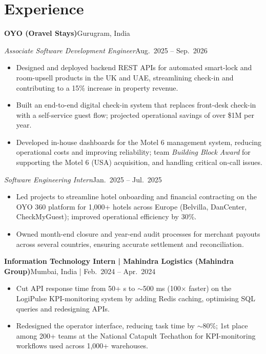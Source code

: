 \documentclass[10pt,a4paper]{article}
\newcommand{\entry}[2]{\textbf{#1}\hfill #2\par}
\newcommand{\subentry}[2]{\textit{#1}\hfill #2\par}
\begin{document}
\section{Experience}
\entry{OYO (Oravel Stays)}{Gurugram, India}
\subentry{Associate Software Development Engineer}{Aug.\ 2025 -- Sep.\ 2026}
\begin{itemize}
  \item Designed and deployed backend REST APIs for automated smart-lock and room-upsell products in the UK and UAE, streamlining check-in and contributing to a 15\% increase in property revenue.
  \item Built an end-to-end digital check-in system that replaces front-desk check-in with a self-service guest flow; projected operational savings of over \$1M per year.
  \item Developed in-house dashboards for the Motel 6 management system, reducing operational costs and improving reliability; team \textit{Building Block Award} for supporting the Motel 6 (USA) acquisition, and handling critical on-call issues.
\end{itemize}
\subentry{Software Engineering Intern}{Jan.\ 2025 -- Jul.\ 2025}
\begin{itemize}
  \item Led projects to streamline hotel onboarding and financial contracting on the OYO 360 platform for 1,000+ hotels across Europe (Belvilla, DanCenter, CheckMyGuest); improved operational efficiency by 30\%.
  \item Owned month-end closure and year-end audit processes for merchant payouts across several countries, ensuring accurate settlement and reconciliation.
\end{itemize}
\vspace{2pt}
\entry{Information Technology Intern \textnormal{| Mahindra Logistics (Mahindra Group)}}{Mumbai, India \;|\; Feb.\ 2024 -- Apr.\ 2024}
\begin{itemize}
  \item Cut API response time from 50+ s to $\sim$500 ms (100$\times$ faster) on the LogiPulse KPI-monitoring system by adding Redis caching, optimising SQL queries and redesigning APIs.
  \item Redesigned the operator interface, reducing task time by $\sim$80\%; 1st place among 200+ teams at the National Catapult Techathon for KPI-monitoring workflows used across 1,000+ warehouses.
\end{itemize}
\end{document}
